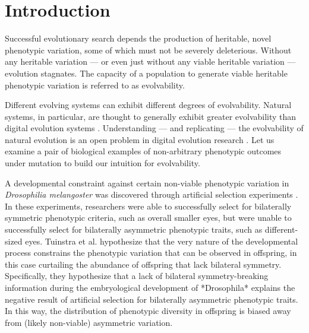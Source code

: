 \section{Introduction} \label{sec:background}

Successful evolutionary search depends the production of heritable, novel phenotypic variation, some of which must not be severely deleterious.
Without any heritable variation --- or even just without any viable heritable variation --- evolution stagnates.
The capacity of a population to generate viable heritable phenotypic variation is referred to as evolvability.

Different evolving systems can exhibit different degrees of evolvability.
Natural systems, in particular, are thought to generally exhibit greater evolvability than digital evolution systems \cite{mengistu2016evolvability}.
Understanding --- and replicating --- the evolvability of natural evolution is an open problem in digital evolution research \cite{mengistu2016evolvability}.
Let us examine a pair of biological examples of non-arbitrary phenotypic outcomes under mutation to build our intuition for evolvability.

A developmental constraint against certain non-viable phenotypic variation in  \textit{Drosophilia melangoster} was discovered through artificial selection experiments \cite{coyne1987lack, tuinstra1990lack}.
In these experiments,  researchers were able to successfully select for bilaterally symmetric phenotypic criteria, such as overall smaller eyes, but were unable to successfully select for bilaterally asymmetric phenotypic traits, such as different-sized eyes.
Tuinstra et al. hypothesize that the very nature of the developmental process constrains the phenotypic variation that can be observed in offspring, in this case curtailing the abundance of offspring that lack bilateral symmetry.
Specifically, they hypothesize that a lack of bilateral symmetry-breaking information during the embryological development of *Drosophila* explains the negative result of artificial selection for bilaterally asymmetric phenotypic traits.
In this way, the distribution of phenotypic diversity in offspring is biased away from (likely non-viable) asymmetric variation.

